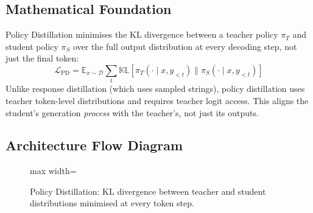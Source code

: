 \subsection{Mathematical Foundation}
Policy Distillation minimises the KL divergence between a teacher policy $\pi_T$ and student policy $\pi_S$ over the full output distribution at every decoding step, not just the final token:
\begin{equation}
  \mathcal{L}_{\text{PD}} = \mathbb{E}_{x \sim \mathcal{D}} \sum_t \mathbb{KL}\!\left[\pi_T(\cdot \mid x, y_{<t}) \| \pi_S(\cdot \mid x, y_{<t})\right]
\end{equation}
Unlike response distillation (which uses sampled strings), policy distillation uses teacher token-level distributions and requires teacher logit access. This aligns the student's generation \emph{process} with the teacher's, not just its outputs.

\subsection{Architecture Flow Diagram}

\begin{figure}[h]
\centering
\begin{adjustbox}{max width=\linewidth}
\end{adjustbox}
\caption{Policy Distillation: KL divergence between teacher and student distributions minimised at every token step.}
\end{figure}

